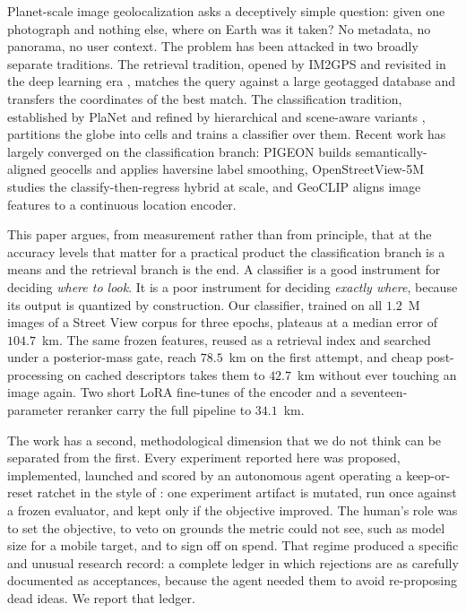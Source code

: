 \documentclass[11pt,a4paper]{article}
\begin{document}
Planet-scale image geolocalization asks a deceptively simple question: given one photograph
and nothing else, where on Earth was it taken? No metadata, no panorama, no user context.
The problem has been attacked in two broadly separate traditions. The retrieval tradition,
opened by IM2GPS \cite{hays2008im2gps} and revisited in the deep learning era
\cite{vo2017revisiting}, matches the query against a large geotagged database and transfers
the coordinates of the best match. The classification tradition, established by PlaNet
\cite{weyand2016planet} and refined by hierarchical and scene-aware variants
\cite{mullerbudack2018geolocation,clark2023where}, partitions the globe into cells and
trains a classifier over them. Recent work has largely converged on the classification
branch: PIGEON \cite{haas2024pigeon} builds semantically-aligned geocells and applies
haversine label smoothing, OpenStreetView-5M \cite{astruc2024osv5m} studies the
classify-then-regress hybrid at scale, and GeoCLIP \cite{cepeda2023geoclip} aligns image
features to a continuous location encoder.

This paper argues, from measurement rather than from principle, that at the accuracy levels
that matter for a practical product the classification branch is a means and the retrieval
branch is the end. A classifier is a good instrument for deciding \emph{where to look}. It
is a poor instrument for deciding \emph{exactly where}, because its output is quantized by
construction. Our classifier, trained on all $1.2$~M images of a Street View corpus for
three epochs, plateaus at a median error of $104.7$~km. The same frozen features, reused as
a retrieval index and searched under a posterior-mass gate, reach $78.5$~km on the first
attempt, and cheap post-processing on cached descriptors takes them to $42.7$~km without
ever touching an image again. Two short LoRA fine-tunes of the encoder and a
seventeen-parameter reranker carry the full pipeline to $34.1$~km.

The work has a second, methodological dimension that we do not think can be separated from
the first. Every experiment reported here was proposed, implemented, launched and scored by
an autonomous agent operating a keep-or-reset ratchet in the style of \cite{karpathy2026autoresearch}:
one experiment artifact is mutated, run once against a frozen evaluator, and kept only if the
objective improved. The human's role was to set the objective, to veto on grounds the metric
could not see, such as model size for a mobile target, and to sign off on spend. That regime
produced a specific and unusual research record: a complete ledger in which rejections are as
carefully documented as acceptances, because the agent needed them to avoid re-proposing dead
ideas. We report that ledger.
\end{document}
